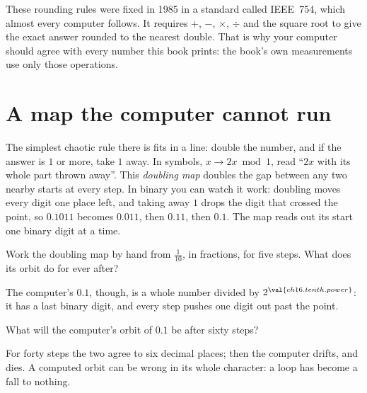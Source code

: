 \begin{note}
These rounding rules were fixed in 1985 in a standard called IEEE~754, which
almost every computer follows. It requires $+$, $-$, $\times$, $\div$ and the
square root to give the exact answer rounded to the nearest double. That is
why your computer should agree with every number this book prints: the book's
own measurements use only those operations.
\end{note}

\section{A map the computer cannot run}
\label{sec:ch16-doubling}

\noindent
The simplest chaotic rule there is fits in a line: double the number, and if
the answer is $1$ or more, take $1$ away. In symbols, $x \to 2x \bmod 1$,
read \enquote{$2x$ with its whole part thrown away}. This \emph{doubling map}
doubles the gap between any two nearby starts at every step. In binary you
can watch it work: doubling moves every digit one place left, and taking away
$1$ drops the digit that crossed the point, so $\num{0.1011}$ becomes
$\num{0.011}$, then $\num{0.11}$, then $\num{0.1}$. The map reads out its
start one binary digit at a time.

\begin{think}
Work the doubling map by hand from $\tfrac{1}{10}$, in fractions, for five
steps. What does its orbit do for ever after?
\end{think}
The computer's $\num{0.1}$, though, is a whole number divided by
$2^{\val{ch16.tenth.power}}$: it has a last binary digit, and every step
pushes one digit out past the point.

\begin{think}
What will the computer's orbit of $\num{0.1}$ be after sixty steps?
\end{think}



\noindent
For forty steps the two agree to six decimal places; then the computer
drifts, and dies. A computed orbit can be wrong in its whole character: a
loop has become a fall to nothing.


